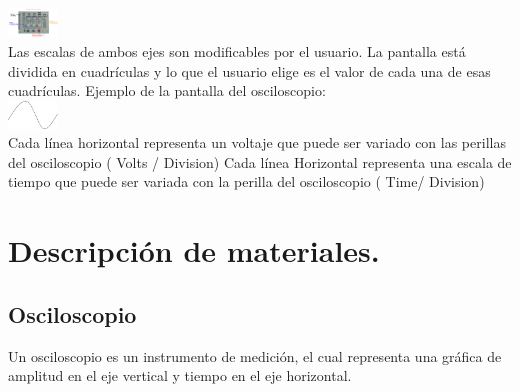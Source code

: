 \documentclass[10pt]{article}
\begin{document}
\begin{multicols}{2}
\includegraphics[width=0.1\textwidth]{Imagenes/Marco Teorico/Imagen5 pero usa el tuyo .png}\\
Las escalas de ambos ejes son modificables por el usuario. La pantalla está dividida en cuadrículas y lo que el usuario elige es el valor de cada una de esas cuadrículas.
Ejemplo de la pantalla del osciloscopio:\\
\includegraphics[width=0.1\textwidth]{Imagenes/Marco Teorico/Imagen6}\\
Cada línea horizontal representa un voltaje que puede ser variado con las perillas del osciloscopio ( Volts / Division)
Cada línea Horizontal representa una escala de tiempo que puede ser variada con la perilla del osciloscopio ( Time/ Division)




\section{Descripción de materiales.}
\subsection{Osciloscopio}

Un osciloscopio es un instrumento de medición, el cual representa una gráfica de amplitud en el eje vertical y tiempo en el eje horizontal.


\end{multicols}
\end{document}
